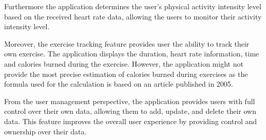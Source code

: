 Furthermore the application determines the user's physical activity intensity level based on the received heart rate data, allowing the users to monitor their activity intensity level.

Moreover, the exercise tracking feature provides user the ability to track their own exercise. The application displays the duration, heart rate information, time and calories burned during the exercise.
However, the application might not provide the most precise estimation of calories burned during exercises as the formula used for the calculation is based on an article published in 2005\autocite{keytel2005energy}.     

From the user management perspective, the application provides users with full control over their own data, allowing them to add, update, and delete their own data.
This feature improves the overall user experience by providing control and ownership over their data.

